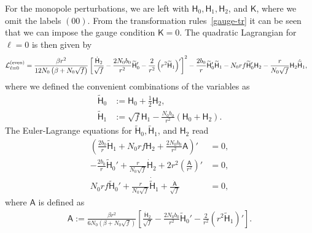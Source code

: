 \documentclass[aps,prd,preprintnumbers,superscriptaddress,nofootinbib,notitlepage]{revtex4-2}
\begin{document}
For the monopole perturbations, we are left with $\mathsf{H}_0,\mathsf{H}_1,\mathsf{H}_2$, and $\mathsf{K}$, where we omit the labels $(00)$.
From the transformation rules~\eqref{gauge-tr} it can be seen that
we can impose the gauge condition $\mathsf{K}=0$.
The quadratic Lagrangian for $\ell=0$ is then given by
\begin{align}
{\cal L}_{\ell=0}^{(\textrm{even})}&=\frac{\beta r^2}{12N_0\left(\beta+N_0\sqrt{f}\right)}
\left[\frac{\dot{\mathsf{H}}_2}{\sqrt{f}}-\frac{2N_0b_0}{r^2}
\widetilde{\mathsf{H}}_0'-\frac{2}{r^2}
\left(r^2\widetilde{\mathsf{H}}_1\right)'
\right]^2-\frac{2b_0}{r}\widetilde{\mathsf{H}}_0'\widetilde{\mathsf{H}}_1
-N_0rf \widetilde{\mathsf{H}}_0'\mathsf{H}_2
-\frac{r}{N_0\sqrt{f}}\mathsf{H}_2\dot{\widetilde{\mathsf{H}}}_1,
\end{align}
where we defined the convenient combinations of the variables as
\begin{align}
\widetilde{\mathsf{H}}_0&:=\mathsf{H}_0+\frac{1}{2}\mathsf{H}_2,
\\
\widetilde{\mathsf{H}}_1&:=\sqrt{f}\mathsf{H}_1-\frac{N_0b_0}{r^2}
(\mathsf{H}_0+\mathsf{H}_2).
\end{align}
The Euler-Lagrange equations for $\widetilde{\mathsf{H}}_0, \widetilde{\mathsf{H}}_1$, and $\mathsf{H}_2$ read
\begin{align}
    \left(\frac{2b_0}{r}\widetilde{\mathsf{H}}_1+N_0 rf \mathsf{H}_2+\frac{2N_0 b_0}{r^2}\mathsf{A}\right)'&=0,\label{ell0eq1}\\
    -\frac{2b_0}{r}\widetilde{\mathsf{H}}_0'+\frac{r}{N_0\sqrt f}\dot{\mathsf{H}}_2
    +2r^2\left(\frac{\mathsf{A}}{r^2}\right)'&=0,\label{ell0eq2}\\
    N_0 rf\widetilde{\mathsf{H}}_0'+\frac{r}{N_0\sqrt f}\dot{\widetilde{\mathsf{H}}}_1+\frac{\dot{\mathsf{A}}}{\sqrt f}&=0\label{ell0eq3},
\end{align}
where $\mathsf{A}$ is defined as
\begin{align}
    \mathsf{A}:=\frac{\beta r^2}{6N_0(\beta+N_0 \sqrt f)}\left[\frac{\dot{\mathsf{H}}_2}{\sqrt{f}}-\frac{2N_0b_0}{r^2}
\widetilde{\mathsf{H}}_0'-\frac{2}{r^2}
\left(r^2\widetilde{\mathsf{H}}_1\right)'\right].\label{def:A}
\end{align}
\end{document}
